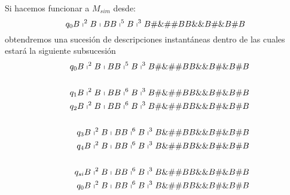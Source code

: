 \begin{frame}
  \PN Si hacemos funcionar a $M_{sim}$ desde:
  \[
    q_{0} B \shortmid^{2} B \shortmid BB \shortmid^{5} B \shortmid^{3} B \#\&\#\# BB \&\& B \#\& B \# B
  \]
  \PN obtendremos una sucesión de descripciones instantáneas dentro de las cuales estará la siguiente subsucesión
  \begin{eqnarray*}
    && q_{0} B \shortmid^{2} B \shortmid BB \shortmid^{5} B \shortmid^{3} B \#\&\#\# BB \&\& B \#\& B \# B \\
    && \\
    && q_{1} B \shortmid^{2} B \shortmid BB \shortmid^{6} B \shortmid^{3} B \#\&\#\# BB \&\& B \#\& B \# B \\
    && q_{2} B \shortmid^{2} B \shortmid BB \shortmid^{6} B \shortmid^{3} B \#\&\#\# BB \&\& B \#\& B \# B \\
    && \\
    && q_{3} B \shortmid^{2} B \shortmid BB \shortmid^{6} B \shortmid^{3} B \&\#\# BB \&\& B \#\& B \# B \\
    && q_{4} B \shortmid^{2} B \shortmid BB \shortmid^{6} B \shortmid^{3} B \&\#\# BB \&\& B \#\& B \# B \\
    && \\
    && q_{si} B \shortmid^{2} B \shortmid BB \shortmid^{6} B \shortmid^{3} B \&\#\# BB \&\& B \#\& B \# B \\
    && q_{0} B \shortmid^{2} B \shortmid BB \shortmid^{6} B \shortmid^{3} B \&\#\# BB \&\& B \#\& B \# B \\
  \end{eqnarray*}
\end{frame}
